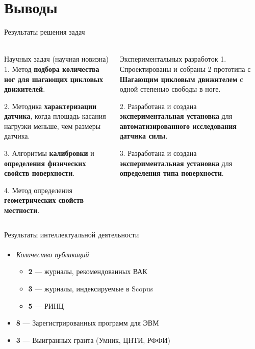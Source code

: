 \section{Выводы}

\begin{frame}[t]{Результаты решения задач}
    \framesubtitle{}
    \begin{columns}[T,onlytextwidth]
        \begin{column}{0.48\textwidth}
            \begin{block}{Научных задач (научная новизна)}
                1. Метод \textbf{подбора количества ног для шагающих цикловых движителей}.

                2. Методика \textbf{характеризации датчика}, когда площадь касания нагрузки меньше, чем размеры датчика.

                3. Алгоритмы \textbf{калибровки} и \textbf{определения физических свойств поверхности}.

                4. Метод определения \textbf{геометрических свойств местности}.

            \end{block}
        \end{column}
        \begin{column}{0.48\textwidth}
            \begin{alertblock}{Экспериментальных разработок}
                1. Спроектированы и собраны 2 прототипа с \textbf{Шагающим цикловым движителем} с одной степенью свободы в ноге.

                2. Разработана и создана \textbf{экспериментальная установка} для \textbf{автоматизированного исследования датчика силы}.

                3. Разработана и создана \textbf{экспериментальная установка} для \textbf{определения типа поверхности}.

            \end{alertblock}
        \end{column}
    \end{columns}
\end{frame}

\begin{frame}[t]{Результаты интеллектуальной деятельности}
    \framesubtitle{}
    \begin{itemize}
        \item \textit{Количество публикаций}
              \begin{itemize}
                  \item \textbf{2} --- журналы, рекомендованных ВАК
                  \item \textbf{3} --- журналы, индексируемые в Scopus
                  \item \textbf{5} --- РИНЦ
              \end{itemize}
        \item \textbf{8} --- Зарегистрированных программ для ЭВМ
        \item \textbf{3} --- Выигранных гранта (Умник, ЦНТИ, РФФИ)
    \end{itemize}
\end{frame}



